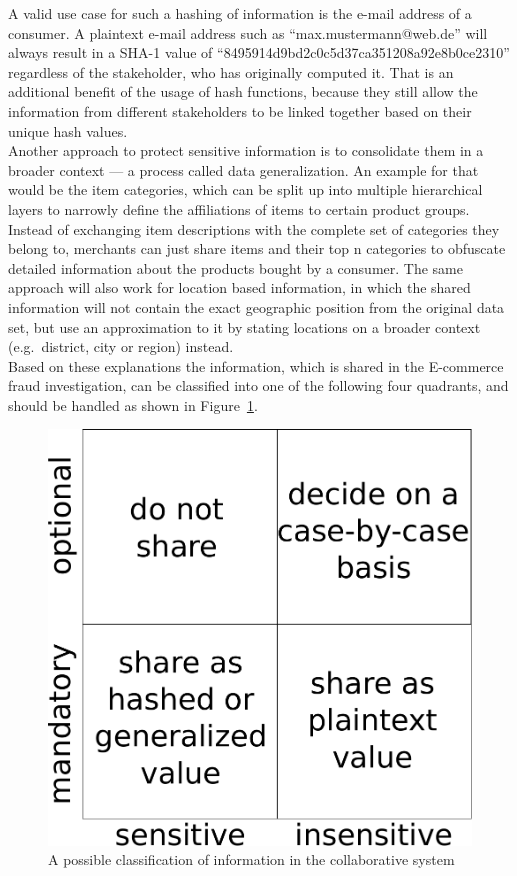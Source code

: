 A valid use case for such a hashing of information is the e-mail address of a consumer. A plaintext e-mail address such as ``max.mustermann@web.de'' will always result in a \gls{SHA-1} value of ``8495914d9bd2c0c5d37ca351208a92e8b0ce2310'' regardless of the stakeholder, who has originally computed it. That is an additional benefit of the usage of hash functions, because they still allow the information from different stakeholders to be linked together based on their unique hash values. \\

Another approach to protect sensitive information is to consolidate them in a broader context --- a process called data generalization. An example for that would be the item categories, which can be split up into multiple hierarchical layers to narrowly define the affiliations of items to certain product groups. Instead of exchanging item descriptions with the complete set of categories they belong to, merchants can just share items and their top n categories to obfuscate detailed information about the products bought by a consumer. The same approach will also work for location based information, in which the shared information will not contain the exact geographic position from the original data set, but use an approximation to it by stating locations on a broader context (e.g.\ district, city or region) instead. \\

Based on these explanations the information, which is shared in the \gls{E-commerce} fraud investigation, can be classified into one of the following four quadrants, and should be handled as shown in Figure~\ref{fig:images_handle_privacy_concerns}. \@

\begin{figure}[H]
	\centering
		\includegraphics[width=0.5\columnwidth]{images/privacy_concerns.pdf}
	\caption{A possible classification of information in the collaborative system}
\label{fig:images_handle_privacy_concerns}
\end{figure}


